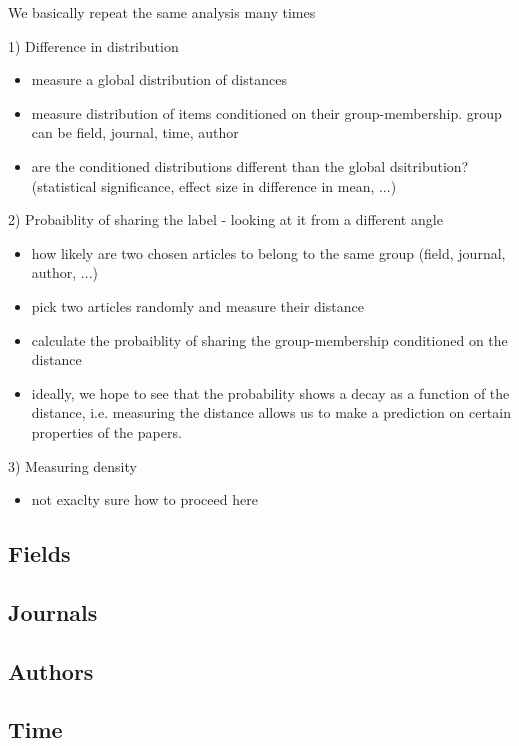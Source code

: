 \documentclass[aps,pre,twocolumn,superscriptaddress]{revtex4-1}
\begin{document}
We basically repeat the same analysis many times

1) Difference in distribution
\begin{itemize}
 \item measure a global distribution of distances
 \item measure distribution of items conditioned on their group-membership. group can be field, journal, time, author
 \item are the conditioned distributions different than the global dsitribution? (statistical significance, effect size in difference in mean, ...)
\end{itemize}

2) Probaiblity of sharing the label - looking at it from a different angle
\begin{itemize}
 \item how likely are two chosen articles to belong to the same group (field, journal, author, ...)
 \item pick two articles randomly and measure their distance
 \item calculate the probaiblity of sharing the group-membership conditioned on the distance
 \item ideally, we hope to see that the probability shows a decay as a function of the distance, i.e. measuring the distance allows us to make a prediction on certain properties of the papers.
\end{itemize}

3) Measuring density
\begin{itemize}
 \item not exaclty sure how to proceed here
\end{itemize}

\subsection{Fields}

\subsection{Journals}

\subsection{Authors}

\subsection{Time}
\end{document}
